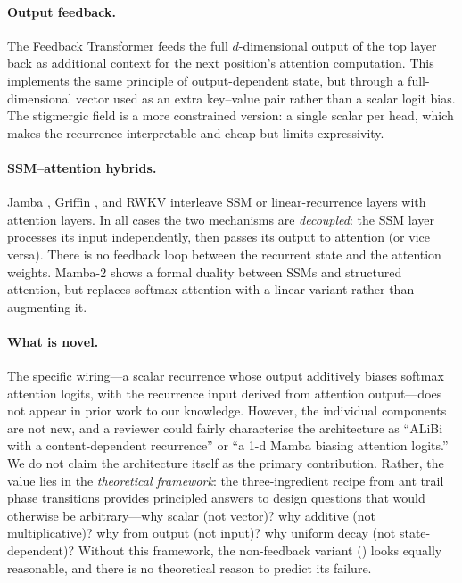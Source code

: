 \documentclass[11pt,a4paper]{article}
\begin{document}
\paragraph{Output feedback.}
The Feedback Transformer \cite{fan2021feedback} feeds the full
$d$-dimensional output of the top layer back as additional context
for the next position's attention computation.  This implements
the same principle of output-dependent state, but through a
full-dimensional vector used as an extra key--value pair rather than
a scalar logit bias.  The stigmergic field is a more constrained
version: a single scalar per head, which makes the recurrence
interpretable and cheap but limits expressivity.

\paragraph{SSM--attention hybrids.}
Jamba \cite{lieber2024jamba}, Griffin \cite{de2024griffin}, and
RWKV \cite{peng2023rwkv} interleave SSM or linear-recurrence layers
with attention layers.  In all cases the two mechanisms are
\emph{decoupled}: the SSM layer processes its input independently,
then passes its output to attention (or vice versa).  There is no
feedback loop between the recurrent state and the attention weights.
Mamba-2 \cite{dao2024mamba2} shows a formal duality between SSMs and
structured attention, but replaces softmax attention with a linear
variant rather than augmenting it.

\paragraph{What is novel.}
The specific wiring---a scalar recurrence whose output additively
biases softmax attention logits, with the recurrence input derived
from attention output---does not appear in prior work to our
knowledge.  However, the individual components are not new, and a
reviewer could fairly characterise the architecture as ``ALiBi with a
content-dependent recurrence'' or ``a 1-d Mamba biasing attention
logits.''  We do not claim the architecture itself as the primary
contribution.  Rather, the value lies in the \emph{theoretical
framework}: the three-ingredient recipe from ant trail phase
transitions provides principled answers to design questions that
would otherwise be arbitrary---why scalar (not vector)? why additive
(not multiplicative)? why from output (not input)? why uniform decay
(not state-dependent)?  Without this framework, the non-feedback
variant () looks equally reasonable, and there
is no theoretical reason to predict its failure.
\end{document}
